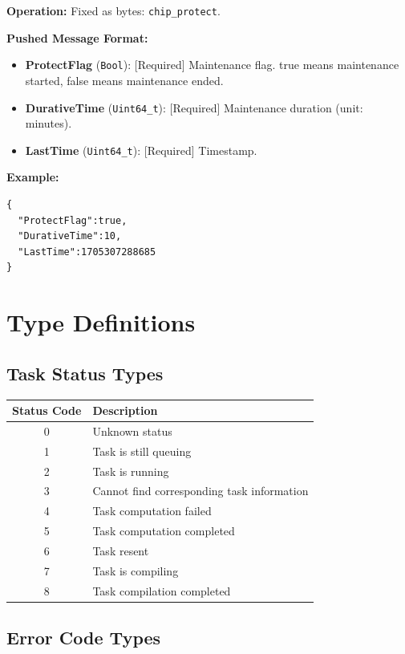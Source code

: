 \documentclass[12pt, a4paper]{article}
\begin{document}
\textbf{Operation:} Fixed as bytes: \texttt{chip\_protect}.

\textbf{Pushed Message Format:}
\begin{itemize}
    \item \textbf{ProtectFlag} (\texttt{Bool}): [Required] Maintenance flag. true means maintenance started, false means maintenance ended.
    \item \textbf{DurativeTime} (\texttt{Uint64\_t}): [Required] Maintenance duration (unit: minutes).
    \item \textbf{LastTime} (\texttt{Uint64\_t}): [Required] Timestamp.
\end{itemize}

\noindent \textbf{Example:}
\begin{lstlisting}
{
  "ProtectFlag":true,
  "DurativeTime":10,
  "LastTime":1705307288685
}
\end{lstlisting}

\section{Type Definitions}

\subsection{Task Status Types}

\begin{longtable}{|c|p{12cm}|}
\hline
\textbf{Status Code} & \textbf{Description} \\ \hline
\endhead
0 & Unknown status \\ \hline
1 & Task is still queuing \\ \hline
2 & Task is running \\ \hline
3 & Cannot find corresponding task information \\ \hline
4 & Task computation failed \\ \hline
5 & Task computation completed \\ \hline
6 & Task resent \\ \hline
7 & Task is compiling \\ \hline
8 & Task compilation completed \\ \hline
\end{longtable}

\subsection{Error Code Types}
\end{document}
